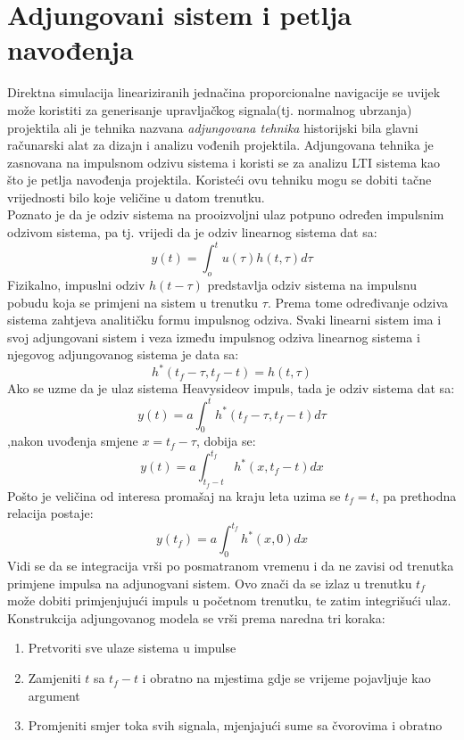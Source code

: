 \section{Adjungovani sistem i petlja navođenja}
Direktna simulacija lineariziranih jednačina proporcionalne navigacije se uvijek može
koristiti za generisanje upravljačkog signala(tj. normalnog ubrzanja) projektila
ali je tehnika nazvana \textit{adjungovana tehnika} historijski bila glavni računarski 
alat za dizajn i analizu vođenih projektila. Adjungovana tehnika je zasnovana 
na impulsnom odzivu sistema i koristi se  za analizu LTI sistema kao što je 
petlja navođenja projektila. Koristeći ovu tehniku mogu se dobiti tačne vrijednosti 
bilo koje veličine u datom trenutku.\\
Poznato je da je odziv sistema na prooizvoljni ulaz potpuno određen impulsnim odzivom sistema, pa 
tj. vrijedi da je odziv linearnog sistema dat sa:
\begin{equation}
    y(t)=\int_o^tu(\tau)h(t,\tau)d\tau
\end{equation}
Fizikalno, impuslni odziv $h(t-\tau)$ predstavlja odziv sistema na impulsnu pobudu koja 
se primjeni na sistem u trenutku $\tau$. Prema tome određivanje odziva sistema zahtjeva analitičku 
formu impulsnog odziva. Svaki linearni sistem ima i svoj adjungovani sistem i veza između impulsnog 
odziva linearnog sistema i njegovog adjungovanog sistema je data sa:
\begin{equation}
    h^*(t_f-\tau,t_f-t)=h(t,\tau)
\end{equation}
Ako se uzme da je ulaz sistema Heavysideov impuls, tada je odziv sistema dat sa:
\begin{equation}
    y(t)=a\int_0^t h^*(t_f-\tau,t_f-t)d\tau
\end{equation}
,nakon uvođenja smjene $x=t_f-\tau$, dobija se:
\begin{equation}
    y(t)=a\int_{t_f-t}^{t_f}h^*(x,t_f-t)dx
\end{equation}
Pošto je veličina od interesa promašaj na kraju leta uzima se $t_f=t$, pa prethodna relacija
postaje:
\begin{equation}
    y(t_f)=a\int_{0}^{t_f}h^*(x,0)dx
\end{equation}
Vidi se da se integracija vrši po posmatranom vremenu i da ne zavisi od trenutka primjene impulsa na adjunogvani sistem. 
Ovo znači da se izlaz u trenutku $t_f$ može dobiti primjenjujući impuls u početnom trenutku, te zatim integrišući ulaz. 
Konstrukcija adjungovanog modela se vrši prema naredna tri koraka:
\begin{enumerate}
    \item Pretvoriti sve ulaze sistema u impulse
    \item Zamjeniti $t$ sa $t_f-t$ i obratno na mjestima gdje se vrijeme pojavljuje kao argument
    \item Promjeniti smjer toka svih signala, mjenjajući sume sa čvorovima i obratno
\end{enumerate}
